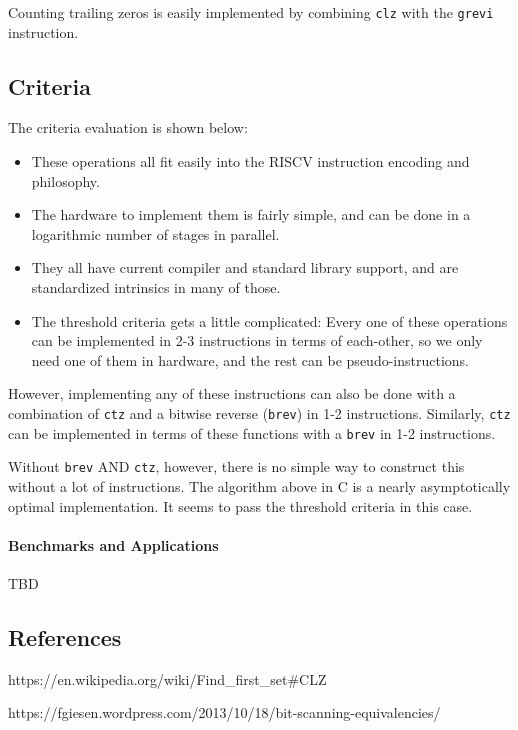 Counting trailing zeros is easily implemented by combining \texttt{clz} with
the \texttt{grevi} instruction.

\subsection{Criteria}

The criteria evaluation is shown below:

\begin{itemize}
\item
  These operations all fit easily into the RISCV instruction encoding
  and philosophy.
\item
  The hardware to implement them is fairly simple, and can be done in a
  logarithmic number of stages in parallel.
\item
  They all have current compiler and standard library support, and are
  standardized intrinsics in many of those.
\item
  The threshold criteria gets a little complicated: Every one of these
  operations can be implemented in 2-3 instructions in terms of
  each-other, so we only need one of them in hardware, and the rest can
  be pseudo-instructions.
\end{itemize}

However, implementing any of these instructions can also be done with a
combination of \texttt{ctz} and a bitwise reverse (\texttt{brev}) in 1-2
instructions. Similarly, \texttt{ctz} can be implemented in terms of
these functions with a \texttt{brev} in 1-2 instructions.

Without \texttt{brev} AND \texttt{ctz}, however, there is no simple way
to construct this without a lot of instructions. The algorithm above in
C is a nearly asymptotically optimal implementation. It seems to pass
the threshold criteria in this case.

\paragraph{Benchmarks and Applications}

TBD

\subsection{References}

https://en.wikipedia.org/wiki/Find\_first\_set\#CLZ

https://fgiesen.wordpress.com/2013/10/18/bit-scanning-equivalencies/

